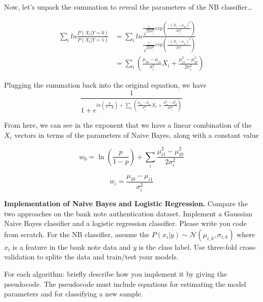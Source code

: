 \documentclass[11pt,largemargins]{homework}
\begin{document}
\begin{alphaparts}
	Now, let's unpack the summation to reveal the parameters of the NB classifier\ldots

	\begin{align*}
		\sum_iln\frac{P(X_i|Y=0)}{P(X_i|Y=1)} &= \sum_iln \frac{\frac{1}{\sqrt{2\pi\sigma_i^2}}exp \left( \frac{-(X_i-\mu_{i0})^2}{2\sigma_i^2} \right)}{\frac{1}{\sqrt{2\pi\sigma_i^2}}exp \left( \frac{-(X_i-\mu_{i1})^2}{2\sigma_i^2} \right)} \\
		&= \sum_i \left( \frac{\mu_{i0}-\mu_{i1}}{\sigma_i^2}X_i + \frac{\mu_{i1}^2-\mu_{i0}^2}{2\sigma_i^2} \right)
	\end{align*}

	Plugging the summation back into the original equation, we have
	$$\frac{1}{1+e^{ln\left( \frac{p}{1-p} \right) + \sum_i \left( \frac{\mu_{i0}-\mu_{i1}}{\sigma_i^2}X_i + \frac{\mu_{i1}^2-\mu_{i0}^2}{2\sigma_i^2} \right)  }}$$

From here, we can see in the exponent that we have a linear combination of the $X_i$ vectors in terms of the parameters of Naive Bayes, along with a constant value

 $$w_0 = \ln\left( \frac{p}{1-p} \right)+ \sum_i \frac{\mu_{i1}^2-\mu_{i0}^2}{2\sigma_i^2}$$ 

 $$w_i= \frac{\mu_{i0}-\mu_{i1}}{\sigma_i^2} $$

	\questionpart
\textbf{Implementation of Naive Bayes and Logistic Regression.} Compare the two approaches on the bank note authentication dataset. Implement a Gaussian Naive Bayes classifier and a logistic regression classifier. Please write you code from scratch. For the NB classifier, assume the $P(x_i|y)\sim\mathcal{N}(\mu_{i, k}, \sigma_{i, k})$ where $x_i$ is a feature in the bank note data and $y$ is the class label. Use three-fold cross-validation to splite the data and train/test your models.
\begin{arabicparts}
	\questionpart
	For each algorithm: briefly describe how you implement it by giving the pseudocode. The pseudocode must include equations for estimating the model parameters and for classifying a new sample.
	

\end{arabicparts}
\end{alphaparts}
\end{document}

